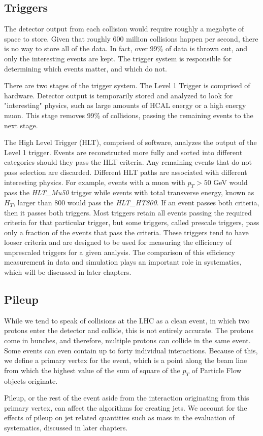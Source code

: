 \subsection{Triggers}
The detector output from each collision would require roughly a megabyte of space to store. Given that roughly 600 million collisions happen per second, there is no way to store all of the data. In fact, over 99\% of data is thrown out, and only the interesting events are kept. The trigger system is responsible for determining which events matter, and which do not.

There are two stages of the trigger system. The Level 1 Trigger is comprised of hardware. Detector output is temporarily stored and analyzed to look for "interesting" physics, such as large amounts of HCAL energy or a high energy muon. This stage removes 99\% of collisions, passing the remaining events to the next stage.

The High Level Trigger (HLT), comprised of software, analyzes the output of the Level 1 trigger. Events are reconstructed more fully and sorted into different categories should they pass the HLT criteria. Any remaining events that do not pass selection are discarded. Different HLT paths are associated with different interesting physics. For example, events with a muon with $p_{T} > 50$ GeV would pass the \textit{HLT\_Mu50} trigger while events with total transverse energy, known as $H_{T}$, larger than 800 would pass the \textit{HLT\_HT800}. If an event passes both criteria, then it passes both triggers. Most triggers retain all events passing the required criteria for that particular trigger, but some triggers, called prescale triggers, pass only a fraction of the events that pass the criteria. These triggers tend to have looser criteria and are designed to be used for measuring the efficiency of unprescaled triggers for a given analysis. The comparison of this efficiency measurement in data and simulation plays an important role in systematics, which will be discussed in later chapters.
\vspace{5mm}

\subsection{Pileup}
While we tend to speak of collisions at the LHC as a clean event, in which two protons enter the detector and collide, this is not entirely accurate. The protons come in bunches, and therefore, multiple protons can collide in the same event. Some events can even contain up to forty individual interactions. Because of this, we define a primary vertex for the event, which is a point along the beam line from which the highest value of the sum of square of the $p_{T}$ of Particle Flow objects originate. 

Pileup, or the rest of the event aside from the interaction originating from this primary vertex, can affect the algorithms for creating jets. We account for the effects of pileup on jet related quantities such as mass in the evaluation of systematics, discussed in later chapters.
